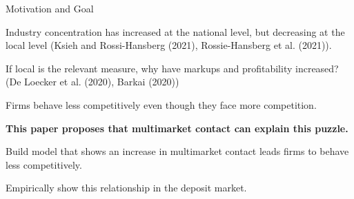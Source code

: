 \documentclass[notes,10.2pt, aspectratio=169]{beamer}
\newenvironment{wideitemize}{\itemize\addtolength{\itemsep}{10pt}}{\enditemize}
\begin{document}
    
\begin{frame}{Motivation and Goal}
\begin{wideitemize}
    \item Industry concentration has increased at the national level, but decreasing at the local level (Ksieh and Rossi-Hansberg (2021), Rossie-Hansberg et al. (2021)). 
    \item If local is the relevant measure, why have markups and profitability increased? (De Loecker et al. (2020), Barkai (2020))
    \item Firms behave less competitively even though they face more competition.
    \pause
    \item \textbf{This paper proposes that multimarket contact can explain this puzzle.}
    \vspace{0.2cm}
    \begin{wideitemize}
      \item Build model that shows an increase in multimarket contact leads firms to behave less competitively. 
      \item Empirically show this relationship in the deposit market. 
    \end{wideitemize}

\end{wideitemize}
    
\end{frame}


    
\end{document}

